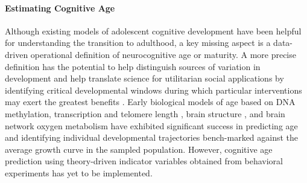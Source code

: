 \documentclass{article}%
\begin{document}
\paragraph*{Estimating Cognitive Age}
Although existing models of adolescent cognitive development have been helpful for understanding the transition to adulthood, a key missing aspect is a data-driven operational definition of neurocognitive age or maturity. A more precise definition has the potential to help distinguish sources of variation in development and help translate science for utilitarian social applications by identifying critical developmental windows during which particular interventions may exert the greatest benefits \citep{somerville2016searching}. Early biological models of age based on DNA methylation, transcription and telomere length \citep{baker1988biomarkers, jylhava2017biological}, brain structure \citep{khundrakpam2015prediction,aycheh2018biological,madan2018predicting}, and brain network oxygen metabolism \citep{dosenbach2010prediction, qin2015predicting} have exhibited significant success in predicting age and identifying individual developmental trajectories bench-marked against the average growth curve in the sampled population. However, cognitive age prediction using theory-driven indicator variables obtained from behavioral experiments has yet to be implemented. 
%
%
\end{document}
